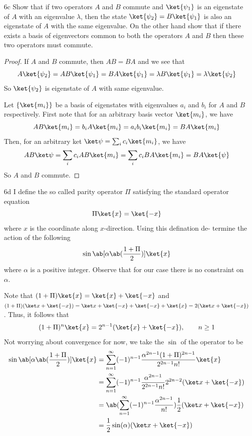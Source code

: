 \documentclass[12pt]{article}
\begin{document}
\begin{exc}{6c}
    Show that if two operators $A$ and $B$ commute and $\ket{\psi_1}$ is an eigenstate
of $A$ with an eigenvalue $\lambda$, then the state $\ket{\psi_2} = B\ket{\psi_1}$ is also an eigenstate of $A$ with the same eigenvalue. On the other hand show that
if there exists a basis of eigenvectors common to both the operators $A$
and $B$ then these two operators must commute.
\end{exc}
\begin{proof}
    If $A$ and $B$ commute, then $AB = BA$ and we see that 
    \[A\ket{\psi_2} = AB \ket{\psi_1} = BA \ket{\psi_1} = \lambda B \ket{\psi_1} = \lambda \ket{\psi_2}\]
    So $\ket{\psi_2}$ is eigenstate of $A$ with same eigenvalue.

    Let $\{\ket{m_i}\}$ be a basis of eigenstates with eigenvalues $a_i$ and $b_i$ for $A$ and $B$ respectively. First note that for an arbitrary basis vector $\ket{m_i}$, we have 
    \[AB \ket{m_i} = b_i A\ket{m_i} = a_i b_i \ket{m_i} = BA\ket{m_i}\]
    Then, for an arbitrary ket $\ket \psi = \sum_i c_i \ket{m_i}$, we have 
    \[AB \ket\psi = \sum_i c_i AB \ket{m_i} = \sum_i c_i BA \ket{m_i} = BA \ket{\psi}\]
    So $A$ and $B$ commute.
\end{proof}
\begin{exc}{6d}
    I define the so called parity operator $\Pi$ satisfying the standard operator
equation
\begin{equation}
    \Pi\ket{x} = \ket{-x}
\end{equation}
where $x$ is the coordinate along $x$-direction. Using this defination de-
termine the action of the following
\begin{equation}
    \sin\ab[\alpha\ab(\frac{1 + \Pi}{2})]\ket{x}
\end{equation}
where $\alpha$ is a positive integer. Observe that for our case there is no
constraint on $\alpha$.
\end{exc}
\begin{ans}
    Note that $(1 + \Pi)\ket{x} = \ket{x} + \ket{-x}$ and $(1 + \Pi)(\ket x + \ket{-x}) = \ket x + \ket{-x} + \ket{-x} + \ket{x}= 2(\ket x + \ket{-x})$. Thus, it follows that 
    \[(1 + \Pi)^n\ket{x} = 2^{n - 1}(\ket{x} + \ket{-x}), \qquad n \geq 1\]
    Not worrying about convergence for now, we take the $\sin$ of the operator to be 
    \begin{align*}
         \sin\ab[\alpha\ab(\frac{1 + \Pi}{2})]\ket{x} 
         &= \sum_{n = 1}^\infty (-1)^{n -1}\frac{\alpha^{2n - 1}(1 + \Pi)^{2n - 1}}{2^{2n - 1} n!}\ket{x} \\ 
         &= \sum_{n = 1}^\infty (-1)^{n -1}\frac{\alpha^{2n - 1}}{2^{2n - 1} n!}2^{2n - 2}(\ket x + \ket{-x}) \\
         &= \ab(\sum_{n = 1}^\infty (-1)^{n -1}\frac{\alpha^{2n - 1}}{n!})\frac 12 (\ket x + \ket{-x}) \\ 
         &= \frac12\sin(\alpha)(\ket x + \ket{-x})
    \end{align*}
\end{ans}
\end{document}
